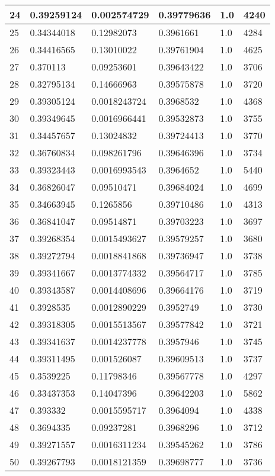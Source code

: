 \begin{longtable}{|l|l|l|l|l|l|}
24 & 0.39259124 & 0.002574729 & 0.39779636 & 1.0 & 4240 \\ \hline 
25 & 0.34344018 & 0.12982073 & 0.3961661 & 1.0 & 4284 \\ \hline 
26 & 0.34416565 & 0.13010022 & 0.39761904 & 1.0 & 4625 \\ \hline 
27 & 0.370113 & 0.09253601 & 0.39643422 & 1.0 & 3706 \\ \hline 
28 & 0.32795134 & 0.14666963 & 0.39575878 & 1.0 & 3720 \\ \hline 
29 & 0.39305124 & 0.0018243724 & 0.3968532 & 1.0 & 4368 \\ \hline 
30 & 0.39349645 & 0.0016966441 & 0.39532873 & 1.0 & 3755 \\ \hline 
31 & 0.34457657 & 0.13024832 & 0.39724413 & 1.0 & 3770 \\ \hline 
32 & 0.36760834 & 0.098261796 & 0.39646396 & 1.0 & 3734 \\ \hline 
33 & 0.39323443 & 0.0016993543 & 0.3964652 & 1.0 & 5440 \\ \hline 
34 & 0.36826047 & 0.09510471 & 0.39684024 & 1.0 & 4699 \\ \hline 
35 & 0.34663945 & 0.1265856 & 0.39710486 & 1.0 & 4313 \\ \hline 
36 & 0.36841047 & 0.09514871 & 0.39703223 & 1.0 & 3697 \\ \hline 
37 & 0.39268354 & 0.0015493627 & 0.39579257 & 1.0 & 3680 \\ \hline 
38 & 0.39272794 & 0.0018841868 & 0.39736947 & 1.0 & 3738 \\ \hline 
39 & 0.39341667 & 0.0013774332 & 0.39564717 & 1.0 & 3785 \\ \hline 
40 & 0.39343587 & 0.0014408696 & 0.39664176 & 1.0 & 3719 \\ \hline 
41 & 0.3928535 & 0.0012890229 & 0.3952749 & 1.0 & 3730 \\ \hline 
42 & 0.39318305 & 0.0015513567 & 0.39577842 & 1.0 & 3721 \\ \hline 
43 & 0.39341637 & 0.0014237778 & 0.3957946 & 1.0 & 3745 \\ \hline 
44 & 0.39311495 & 0.001526087 & 0.39609513 & 1.0 & 3737 \\ \hline 
45 & 0.3539225 & 0.11798346 & 0.39567778 & 1.0 & 4297 \\ \hline 
46 & 0.33437353 & 0.14047396 & 0.39642203 & 1.0 & 5862 \\ \hline 
47 & 0.393332 & 0.0015595717 & 0.3964094 & 1.0 & 4338 \\ \hline 
48 & 0.3694335 & 0.09237281 & 0.3968296 & 1.0 & 3712 \\ \hline 
49 & 0.39271557 & 0.0016311234 & 0.39545262 & 1.0 & 3786 \\ \hline 
50 & 0.39267793 & 0.0018121359 & 0.39698777 & 1.0 & 3736 \\ \hline 
\end{longtable}